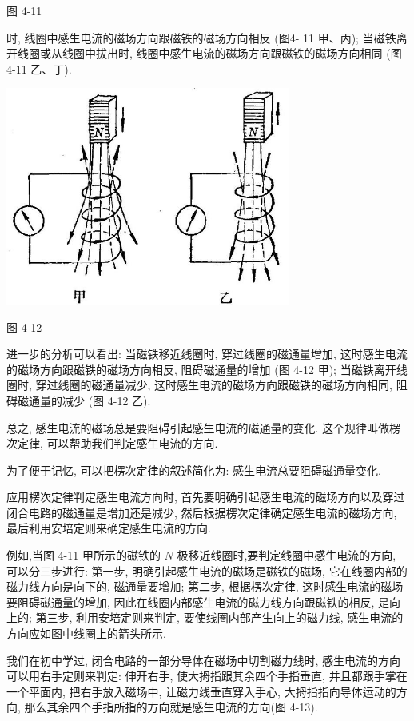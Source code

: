 \documentclass[10pt]{article}
\begin{document}
图 4-11

时, 线圈中感生电流的磁场方向跟磁铁的磁场方向相反 (图4- 11 甲、丙); 当磁铁离开线圈或从线圈中拔出时, 线圈中感生电流的磁场方向跟磁铁的磁场方向相同 (图 4-11 乙、丁).

\begin{center}
\includegraphics[max width=0.7\textwidth]{images/01913056-1f15-74d8-9184-9aab52c9d66b_138_173753.jpg}
\end{center}

图 4-12

进一步的分析可以看出: 当磁铁移近线圈时, 穿过线圈的磁通量增加, 这时感生电流的磁场方向跟磁铁的磁场方向相反, 阻碍磁通量的增加 (图 4-12 甲); 当磁铁离开线圈时, 穿过线圈的磁通量减少, 这时感生电流的磁场方向跟磁铁的磁场方向相同, 阻碍磁通量的减少 (图 4-12 乙).

总之, 感生电流的磁场总是要阻碍引起感生电流的磁通量的变化. 这个规律叫做楞次定律, 可以帮助我们判定感生电流的方向.

为了便于记忆, 可以把楞次定律的叙述简化为: 感生电流总要阻碍磁通量变化.

应用楞次定律判定感生电流方向时, 首先要明确引起感生电流的磁场方向以及穿过闭合电路的磁通量是增加还是减少, 然后根据楞次定律确定感生电流的磁场方向, 最后利用安培定则来确定感生电流的方向.

例如,当图 4-11 甲所示的磁铁的 \(N\) 极移近线圈时,要判定线圈中感生电流的方向, 可以分三步进行: 第一步, 明确引起感生电流的磁场是磁铁的磁场, 它在线圈内部的磁力线方向是向下的, 磁通量要增加; 第二步, 根据楞次定律, 这时感生电流的磁场要阻碍磁通量的增加, 因此在线圈内部感生电流的磁力线方向跟磁铁的相反, 是向上的; 第三步, 利用安培定则来判定, 要使线圈内部产生向上的磁力线, 感生电流的方向应如图中线圈上的箭头所示.

我们在初中学过, 闭合电路的一部分导体在磁场中切割磁力线时, 感生电流的方向可以用右手定则来判定: 伸开右手, 使大拇指跟其余四个手指垂直, 并且都跟手掌在一个平面内, 把右手放入磁场中, 让磁力线垂直穿入手心, 大拇指指向导体运动的方向, 那么其余四个手指所指的方向就是感生电流的方向(图 4-13).
\end{document}
